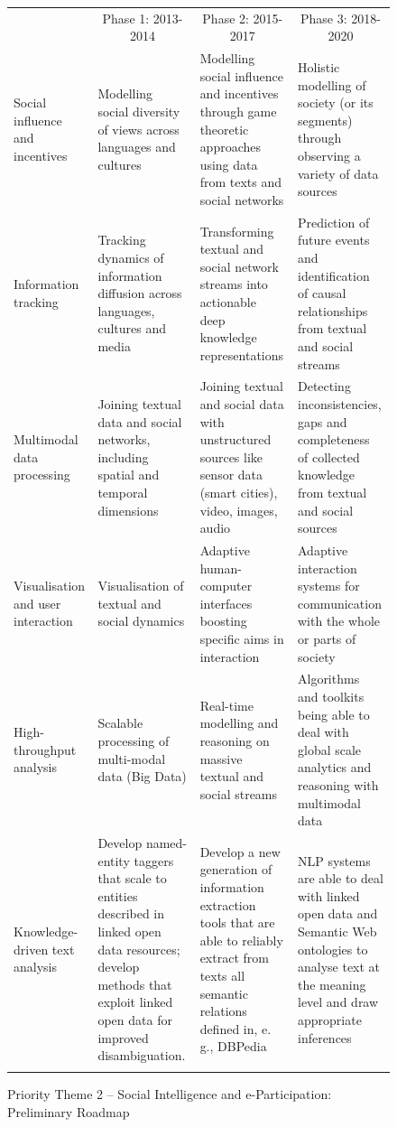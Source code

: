 \documentclass[10pt, plain]{../../metanetpaper}
\begin{document}
\begin{multicols}{2}
\begin{figure}[htb]
  \centering
  \small
  \begin{tabular}{@{}p{2.5cm}p{4cm}p{4cm}p{4cm}@{}} \toprule\addlinespace
    \multicolumn{1}{c}{Research Priority} & \multicolumn{1}{c}{Phase 1: 2013-2014} & \multicolumn{1}{c}{Phase 2: 2015-2017} & \multicolumn{1}{c}{Phase 3: 2018-2020} \\ \addlinespace\midrule\addlinespace
    Social influence and incentives & Modelling social diversity of views across languages and cultures & Modelling social influence and incentives  through game theoretic approaches using data from texts and social networks & Holistic modelling of society (or its segments) through observing a variety of data sources \\ \addlinespace
    Information tracking & Tracking dynamics of information diffusion across languages, cultures and media & Transforming textual and social network streams into actionable deep knowledge representations & Prediction of future events and identification of causal relationships from textual and social streams \\ \addlinespace
    Multimodal data processing & Joining textual data and social networks, including spatial and temporal dimensions & Joining textual and social data with unstructured sources like sensor data (smart cities), video, images, audio & Detecting inconsistencies, gaps and completeness of collected knowledge from textual and social sources \\ \addlinespace
    Visualisation and user interaction & Visualisation of textual and social dynamics & Adaptive human-computer interfaces boosting specific aims in interaction & Adaptive interaction systems for communication with the whole or parts of society \\ \addlinespace
    High-throughput analysis & Scalable processing of multi-modal data (Big Data) & Real-time modelling and reasoning on massive textual and social streams & Algorithms and toolkits being able to deal with global scale analytics and reasoning with multimodal data \\ \addlinespace
    Knowledge-driven text analysis & Develop named-entity taggers that scale to entities described in linked open data resources; develop methods that exploit linked open data for improved disambiguation. & Develop a new generation of information extraction tools that are able to reliably extract from texts all semantic relations defined in, e.\,g., DBPedia & NLP systems are able to deal with linked open data and Semantic Web ontologies to analyse text at the meaning level and draw appropriate inferences \\  \addlinespace\bottomrule
  \end{tabular}
  \caption{Priority Theme 2 -- Social Intelligence and e-Participation: Preliminary Roadmap}
  \label{fig:pt2-roadmap}
\end{figure}


\end{multicols}
\end{document}

